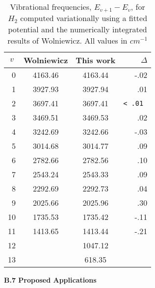 \begin{table}[tbp] \centering%
\begin{tabular}{cccr}
\hline\hline
$v$ & Wolniewicz & This work & $\Delta $ \\ \hline
\multicolumn{1}{r}{0} & 4163.46 & 4163.44 & -.02 \\ 
\multicolumn{1}{r}{1} & 3927.93 & 3927.94 & .01 \\ 
\multicolumn{1}{r}{2} & 3697.41 & 3697.41 &  \tt{<} .01 \\ 
\multicolumn{1}{r}{3} & 3469.51 & 3469.53 & .02 \\ 
\multicolumn{1}{r}{4} & 3242.69 & 3242.66 & -.03 \\ 
\multicolumn{1}{r}{5} & 3014.68 & 3014.77 & .09 \\ 
\multicolumn{1}{r}{6} & 2782.66 & 2782.56 & .10 \\ 
\multicolumn{1}{r}{7} & 2543.24 & 2543.33 & .09 \\ 
\multicolumn{1}{r}{8} & 2292.69 & 2292.73 & .04 \\ 
\multicolumn{1}{r}{9} & 2025.66 & 2025.96 & .30 \\ 
\multicolumn{1}{r}{10} & 1735.53 & 1735.42 & -.11 \\ 
\multicolumn{1}{r}{11} & 1413.65 & 1413.44 & -.21 \\ 
\multicolumn{1}{r}{12} &  & 1047.12 &  \\ 
\multicolumn{1}{r}{13} &  & 618.35 &  \\ \hline
\end{tabular}
\caption{Vibrational frequencies, $ E_{v+1}-E_{v }$,  for $ H_2 $ computed
variationally
 using a fitted potential  and the numerically integrated results of
Wolniewicz.
 All values in $ cm^{-1} $ } \label{freqtab}%
\end{table}%

\vspace{2mm}
\noindent
{\bf B.7 Proposed Applications}


